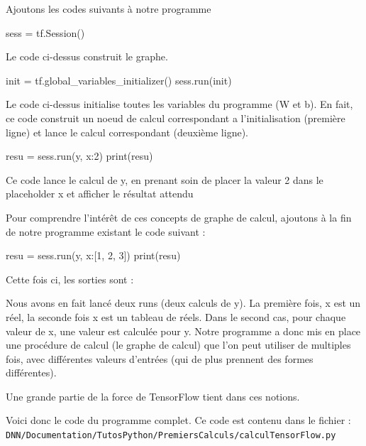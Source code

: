 \documentclass[a4paper,11pt]{book}
\begin{document}
Ajoutons les codes suivants à notre programme
\begin{mypython}
sess = tf.Session()
\end{mypython}
Le code ci-dessus construit le graphe.
\begin{mypython}
init = tf.global_variables_initializer()
sess.run(init)
\end{mypython}
Le code ci-dessus initialise toutes les variables du programme (W et b). En fait, ce code construit un noeud de calcul correspondant a l'initialisation (première ligne) et lance le calcul correspondant (deuxième ligne).

\begin{mypython} 
resu = sess.run(y, {x:2}) 
print(resu)
\end{mypython}
Ce code lance le calcul de y, en prenant soin de placer la valeur 2 dans le placeholder x et afficher le résultat attendu
\begin{myoutput}
[0.3]
\end{myoutput}
Pour comprendre l'intérêt de ces concepts de graphe de calcul, ajoutons à la fin de notre programme existant le code suivant :

\begin{mypython} 
resu = sess.run(y, {x:[1, 2, 3]}) 
print(resu)
\end{mypython} 

Cette fois ci, les sorties sont :

\begin{mypython} 
[0.3]
[0.  0.3 0.6]
\end{mypython} 

Nous avons en fait lancé deux runs (deux calculs de y). La première fois, x est un réel, la seconde fois x est un tableau de réels. Dans le second cas, pour chaque valeur de x, une valeur est calculée pour y.
Notre programme a donc mis en place une procédure de calcul (le graphe de calcul) que l'on peut utiliser de multiples fois, avec différentes valeurs d'entrées (qui de plus prennent des formes différentes).

Une grande partie de la force de TensorFlow tient dans ces notions.

Voici donc le code du programme complet. Ce code est contenu dans le fichier :\\
\verb+DNN/Documentation/TutosPython/PremiersCalculs/calculTensorFlow.py+


\end{document}
